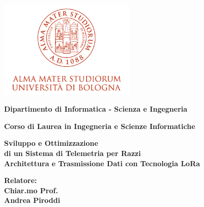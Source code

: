 \documentclass[12pt,a4paper,twoside]{book}
\begin{document}
\pagestyle{empty}

\begin{titlepage}

    \begin{center}

        \includegraphics[width=6.5cm,height=4.7cm]{img/marchio-di-ateneo.png}

        \vspace{10mm}

        {\large{\bf{Dipartimento di Informatica - Scienza e Ingegneria}}}

        \vspace{5mm}

        {\Large{\bf{Corso di Laurea in Ingegneria e Scienze Informatiche}}}

        \vspace{15mm}

        {\Huge{\bf Sviluppo e Ottimizzazione}}\\
        \vspace{3mm}
        {\Huge{\bf di un Sistema di Telemetria per Razzi}}\\
        \vspace{3mm}
        {\Large{\bf Architettura e Trasmissione Dati con Tecnologia LoRa}}
    \end{center}

    \vspace{50mm}

    \begin{minipage}[t]{0.40\textwidth}
        {\Large{\bf Relatore: \\ Chiar.mo Prof.\\ Andrea Piroddi}}


\end{minipage}
\end{titlepage}
\end{document}
